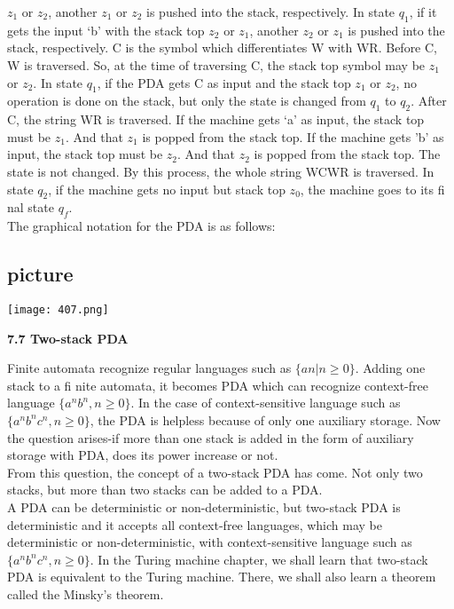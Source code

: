 \documentclass{article}
\begin{document}
\vspace*{0.5cm}
$z_1$ or $z_2$, another $z_1$ or $z_2$ is pushed into the stack, respectively. In state $q_1$, if it gets the input ‘b’ with the
stack top $z_2$ or $z_1$, another $z_2$ or $z_1$ is pushed into the stack, respectively.
\hspace*{0.5cm} C is the symbol which differentiates W with WR. Before C, W is traversed. So, at the time of traversing
C, the stack top symbol may be $z_1$ or $z_2$. In state $q_1$, if the PDA gets C as input and the stack top $z_1$ or
$z_2$, no operation is done on the stack, but only the state is changed from $q_1$ to $q_2$. After C, the string WR is
traversed. If the machine gets ‘a’ as input, the stack top must be $z_1$. And that $z_1$ is popped from the stack
top. If the machine gets 'b' as input, the stack top must be $z_2$. And that $z_2$ is popped from the stack top.
The state is not changed. By this process, the whole string WCWR is traversed. In state $q_2$, if the machine
gets no input but stack top $z_0$, the machine goes to its fi nal state $q_f$.\\

The graphical notation for the PDA is as follows:\\

\vspace*{0.3cm}
\begin{center}
\section{picture}
\texttt{[image: 407.png]}
\end{center}

\large{
\textbf{7.7 Two-stack PDA}
}

\small{
Finite automata recognize regular languages such as $\{an | n \geq 0\}$. Adding one stack to a fi nite automata, it
becomes PDA which can recognize context-free language $\{a^nb^n, n \geq 0\}$. In the case of context-sensitive
language such as $\{a^nb^n c^n, n \geq 0\}$, the PDA is helpless because of only one auxiliary storage. Now the
question arises-if more than one stack is added in the form of auxiliary storage with PDA, does its
power increase or not.}\\

\hspace*{0.5cm} From this question, the concept of a two-stack PDA has come. Not only two stacks, but more than
two stacks can be added to a PDA.\\
\hspace*{0.5cm} A PDA can be deterministic or non-deterministic, but two-stack PDA is deterministic and it accepts
all context-free languages, which may be deterministic or non-deterministic, with context-sensitive language
such as $\{a^nb^n c^n, n \geq 0\}$. In the Turing machine chapter, we shall learn that two-stack PDA is
equivalent to the Turing machine. There, we shall also learn a theorem called the Minsky's theorem.
\end{document}

